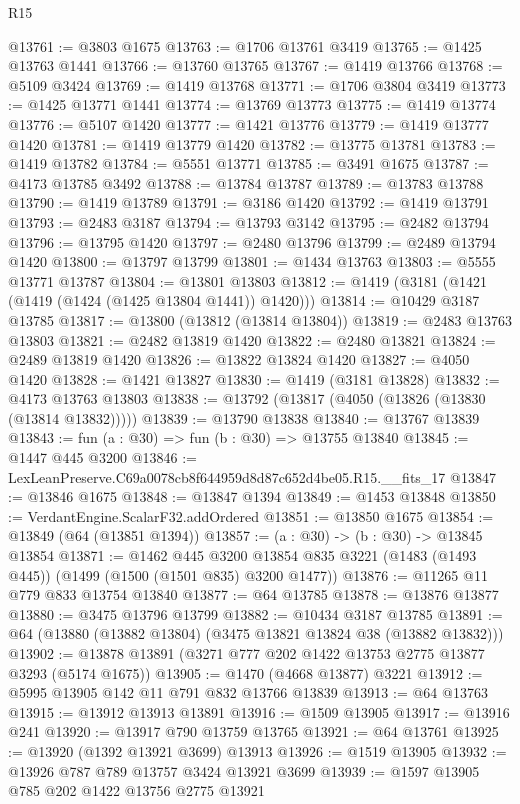 \begin{lexlean}{R15}
\begin{coremodule}
@13761 := @3803 @1675
@13763 := @1706 @13761 @3419
@13765 := @1425 @13763 @1441
@13766 := @13760 @13765
@13767 := @1419 @13766
@13768 := @5109 @3424
@13769 := @1419 @13768
@13771 := @1706 @3804 @3419
@13773 := @1425 @13771 @1441
@13774 := @13769 @13773
@13775 := @1419 @13774
@13776 := @5107 @1420
@13777 := @1421 @13776
@13779 := @1419 @13777 @1420
@13781 := @1419 @13779 @1420
@13782 := @13775 @13781
@13783 := @1419 @13782
@13784 := @5551 @13771
@13785 := @3491 @1675
@13787 := @4173 @13785 @3492
@13788 := @13784 @13787
@13789 := @13783 @13788
@13790 := @1419 @13789
@13791 := @3186 @1420
@13792 := @1419 @13791
@13793 := @2483 @3187
@13794 := @13793 @3142
@13795 := @2482 @13794
@13796 := @13795 @1420
@13797 := @2480 @13796
@13799 := @2489 @13794 @1420
@13800 := @13797 @13799
@13801 := @1434 @13763
@13803 := @5555 @13771 @13787
@13804 := @13801 @13803
@13812 := @1419 (@3181 (@1421 (@1419 (@1424 (@1425 @13804 @1441)) @1420)))
@13814 := @10429 @3187 @13785
@13817 := @13800 (@13812 (@13814 @13804))
@13819 := @2483 @13763 @13803
@13821 := @2482 @13819 @1420
@13822 := @2480 @13821
@13824 := @2489 @13819 @1420
@13826 := @13822 @13824 @1420
@13827 := @4050 @1420
@13828 := @1421 @13827
@13830 := @1419 (@3181 @13828)
@13832 := @4173 @13763 @13803
@13838 := @13792 (@13817 (@4050 (@13826 (@13830 (@13814 @13832)))))
@13839 := @13790 @13838
@13840 := @13767 @13839
@13843 := fun (a : @30) => fun (b : @30) => @13755 @13840
@13845 := @1447 @445 @3200
@13846 := LexLeanPreserve.C69a0078cb8f644959d8d87c652d4be05.R15.__fits_17
@13847 := @13846 @1675
@13848 := @13847 @1394
@13849 := @1453 @13848
@13850 := VerdantEngine.ScalarF32.addOrdered
@13851 := @13850 @1675
@13854 := @13849 (@64 (@13851 @1394))
@13857 := (a : @30) -> (b : @30) -> @13845 @13854
@13871 := @1462
    @445
    @3200
    @13854
    @835
    @3221
    (@1483 (@1493 @445))
    (@1499 (@1500 (@1501 @835) @3200 @1477))
@13876 := @11265 @11 @779 @833 @13754 @13840
@13877 := @64 @13785
@13878 := @13876 @13877
@13880 := @3475 @13796 @13799
@13882 := @10434 @3187 @13785
@13891 := @64 (@13880 (@13882 @13804) (@3475 @13821 @13824 @38 (@13882 @13832)))
@13902 := @13878 @13891 (@3271 @777 @202 @1422 @13753 @2775 @13877 @3293 (@5174 @1675))
@13905 := @1470 (@4668 @13877) @3221
@13912 := @5995 @13905 @142 @11 @791 @832 @13766 @13839
@13913 := @64 @13763
@13915 := @13912 @13913 @13891
@13916 := @1509 @13905
@13917 := @13916 @241
@13920 := @13917 @790 @13759 @13765
@13921 := @64 @13761
@13925 := @13920 (@1392 @13921 @3699) @13913
@13926 := @1519 @13905
@13932 := @13926 @787 @789 @13757 @3424 @13921 @3699
@13939 := @1597 @13905 @785 @202 @1422 @13756 @2775 @13921

\end{coremodule}
\end{lexlean}
